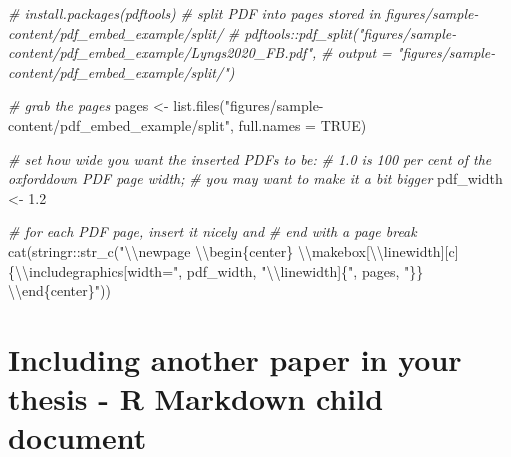 \documentclass[a4paper, nobind]{templates/ociamthesis}
\newenvironment{Shaded}{\begin{snugshade}}{\end{snugshade}}
\newcommand{\AttributeTok}[1]{\textcolor[rgb]{0.77,0.63,0.00}{#1}}
\newcommand{\CommentTok}[1]{\textcolor[rgb]{0.56,0.35,0.01}{\textit{#1}}}
\newcommand{\ConstantTok}[1]{\textcolor[rgb]{0.00,0.00,0.00}{#1}}
\newcommand{\FloatTok}[1]{\textcolor[rgb]{0.00,0.00,0.81}{#1}}
\newcommand{\FunctionTok}[1]{\textcolor[rgb]{0.00,0.00,0.00}{#1}}
\newcommand{\NormalTok}[1]{#1}
\newcommand{\OtherTok}[1]{\textcolor[rgb]{0.56,0.35,0.01}{#1}}
\newcommand{\SpecialCharTok}[1]{\textcolor[rgb]{0.00,0.00,0.00}{#1}}
\newcommand{\StringTok}[1]{\textcolor[rgb]{0.31,0.60,0.02}{#1}}
\renewenvironment{Shaded}
{
  \vspace{10pt}%
  \begin{snugshade}%
}{%
  \end{snugshade}%
  \vspace{8pt}%
}
\begin{document}
\begin{Shaded}
\begin{Highlighting}[]
\CommentTok{\# install.packages(pdftools)}
\CommentTok{\# split PDF into pages stored in figures/sample{-}content/pdf\_embed\_example/split/}
\CommentTok{\# pdftools::pdf\_split("figures/sample{-}content/pdf\_embed\_example/Lyngs2020\_FB.pdf",}
\CommentTok{\#        output = "figures/sample{-}content/pdf\_embed\_example/split/")}

\CommentTok{\# grab the pages}
\NormalTok{pages }\OtherTok{\textless{}{-}} \FunctionTok{list.files}\NormalTok{(}\StringTok{"figures/sample{-}content/pdf\_embed\_example/split"}\NormalTok{, }\AttributeTok{full.names =} \ConstantTok{TRUE}\NormalTok{)}

\CommentTok{\# set how wide you want the inserted PDFs to be: }
\CommentTok{\# 1.0 is 100 per cent of the oxforddown PDF page width;}
\CommentTok{\# you may want to make it a bit bigger}
\NormalTok{pdf\_width }\OtherTok{\textless{}{-}} \FloatTok{1.2}

\CommentTok{\# for each PDF page, insert it nicely and}
\CommentTok{\# end with a page break}
\FunctionTok{cat}\NormalTok{(stringr}\SpecialCharTok{::}\FunctionTok{str\_c}\NormalTok{(}\StringTok{"}\SpecialCharTok{\textbackslash{}\textbackslash{}}\StringTok{newpage }\SpecialCharTok{\textbackslash{}\textbackslash{}}\StringTok{begin\{center\} }\SpecialCharTok{\textbackslash{}\textbackslash{}}\StringTok{makebox[}\SpecialCharTok{\textbackslash{}\textbackslash{}}\StringTok{linewidth][c]\{}\SpecialCharTok{\textbackslash{}\textbackslash{}}\StringTok{includegraphics[width="}\NormalTok{, pdf\_width, }\StringTok{"}\SpecialCharTok{\textbackslash{}\textbackslash{}}\StringTok{linewidth]\{"}\NormalTok{, pages, }\StringTok{"\}\} }\SpecialCharTok{\textbackslash{}\textbackslash{}}\StringTok{end\{center\}"}\NormalTok{))}
\end{Highlighting}
\end{Shaded}

\newpage \begin{center}  \end{center} \newpage \begin{center}  \end{center}

\hypertarget{embed-rmd}{%
\section{Including another paper in your thesis - R Markdown child document}\label{embed-rmd}}
\end{document}
